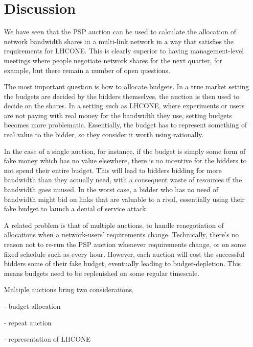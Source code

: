 \section{Discussion}

We have seen that the PSP auction can be used to calculate the allocation of network bandwidth shares in a multi-link network in a way that satisfies the requirements for LHCONE. This is clearly superior to having management-level meetings where people negotiate network shares for the next quarter, for example, but there remain a number of open questions.

The most important question is how to allocate budgets. In a true market setting the budgets are decided by the bidders themselves, the auction is then used to decide on the shares. In a setting such as LHCONE, where experiments or users are not paying with real money for the bandwidth they use, setting budgets becomes more problematic. Essentially, the budget has to represent something of real value to the bidder, so they consider it worth using rationally.

In the case of a single auction, for instance, if the budget is simply some form of fake money which has no value elsewhere, there is no incentive for the bidders to not spend their entire budget. This will lead to bidders bidding for more bandwidth than they actually need, with a consequent waste of resources if the bandwidth goes unused. In the worst case, a bidder who has no need of bandwidth might bid on links that are valuable to a rival, essentially using their fake budget to launch a denial of service attack.

A related problem is that of multiple auctions, to handle renegotiation of allocations when a network-users' requirements change. Technically, there's no reason not to re-run the PSP auction whenever requirements change, or on some fixed schedule such as every hour. However, each auction will cost the successful bidders some of their fake budget, eventually leading to budget-depletion. This means budgets need to be replenished on some regular timescale. 

Multiple auctions bring two considerations, 


- budget allocation

- repeat auction

- representation of LHCONE